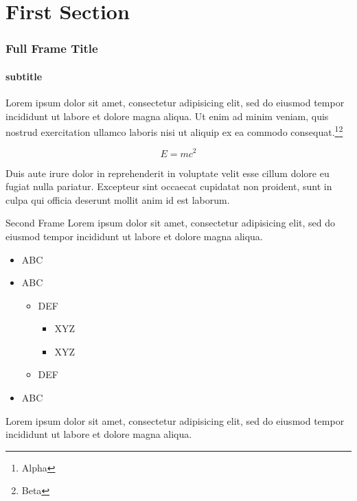 
\section{First Section}

\begin{frame}{}
    \frametitle[Short Frame Title]{Full Frame Title}
    \framesubtitle{subtitle}

    Lorem ipsum dolor sit amet, consectetur adipisicing elit, sed do eiusmod
    tempor incididunt ut labore et dolore magna aliqua. Ut enim ad minim veniam,
    quis nostrud exercitation ullamco laboris nisi ut aliquip ex ea commodo
    consequat.\footnote{Alpha}\footnote{Beta}

    \begin{equation}
        E = mc^{2}
    \end{equation}

    Duis aute irure dolor in \alert{reprehenderit} in voluptate velit esse
    cillum dolore eu fugiat nulla pariatur. Excepteur sint occaecat cupidatat non
    proident, sunt in culpa qui officia deserunt mollit anim id est laborum.
\end{frame}

\begin{frame}[plain]{Second Frame}
    Lorem ipsum dolor sit amet, consectetur adipisicing elit, sed do eiusmod tempor incididunt ut labore et dolore magna aliqua.

    \begin{itemize}
        \item ABC
        \item ABC
        \begin{itemize}
            \item DEF
            \begin{itemize}
                \item XYZ
                \item XYZ
            \end{itemize}
            \item DEF
        \end{itemize}
        \item ABC
    \end{itemize}

    \pause

    Lorem ipsum dolor sit amet, consectetur adipisicing elit, sed do eiusmod tempor incididunt ut labore et dolore magna aliqua.
\end{frame}

